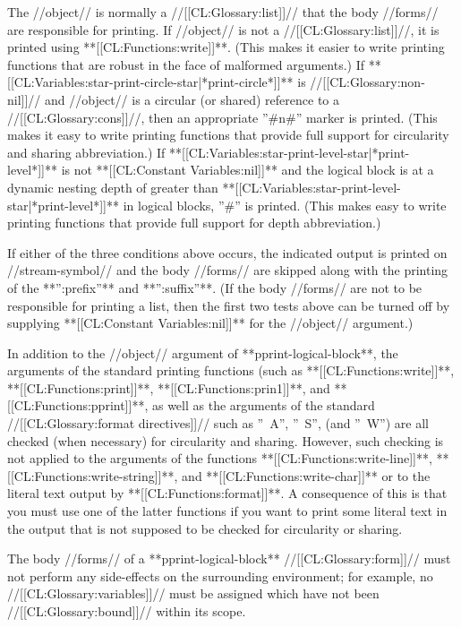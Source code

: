 The //object// is normally a //[[CL:Glossary:list]]// that the body //forms// are responsible for printing. If //object// is not a //[[CL:Glossary:list]]//, it is printed using **[[CL:Functions:write]]**. (This makes it easier to write printing functions that are robust in the face of malformed arguments.) If **[[CL:Variables:star-print-circle-star|*print-circle*]]** is //[[CL:Glossary:non-nil]]// and //object// is a circular (or shared) reference to a //[[CL:Glossary:cons]]//, then an appropriate ''#n#'' marker is printed. (This makes it easy to write printing functions that provide full support for circularity and sharing abbreviation.) If **[[CL:Variables:star-print-level-star|*print-level*]]** is not **[[CL:Constant Variables:nil]]** and the logical block is at a dynamic nesting depth of greater than **[[CL:Variables:star-print-level-star|*print-level*]]** in logical blocks, ''#'' is printed. (This makes easy to write printing functions that provide full support for depth abbreviation.)

If either of the three conditions above occurs, the indicated output is printed on //stream-symbol// and the body //forms// are skipped along with the printing of the **'':prefix''** and **'':suffix''**. (If the body //forms// are not to be responsible for printing a list, then the first two tests above can be turned off by supplying **[[CL:Constant Variables:nil]]** for the //object// argument.)

In addition to the //object// argument of **pprint-logical-block**, the arguments of the standard printing functions (such as **[[CL:Functions:write]]**, **[[CL:Functions:print]]**, **[[CL:Functions:prin1]]**, and **[[CL:Functions:pprint]]**, as well as the arguments of the standard //[[CL:Glossary:format directives]]// such as ''~A'', ''~S'', (and ''~W'') are all checked (when necessary) for circularity and sharing. However, such checking is not applied to the arguments of the functions **[[CL:Functions:write-line]]**, **[[CL:Functions:write-string]]**, and **[[CL:Functions:write-char]]** or to the literal text output by **[[CL:Functions:format]]**. A consequence of this is that you must use one of the latter functions if you want to print some literal text in the output that is not supposed to be checked for circularity or sharing.

The body //forms// of a **pprint-logical-block** //[[CL:Glossary:form]]// must not perform any side-effects on the surrounding environment; for example, no //[[CL:Glossary:variables]]// must be assigned which have not been //[[CL:Glossary:bound]]// within its scope.

